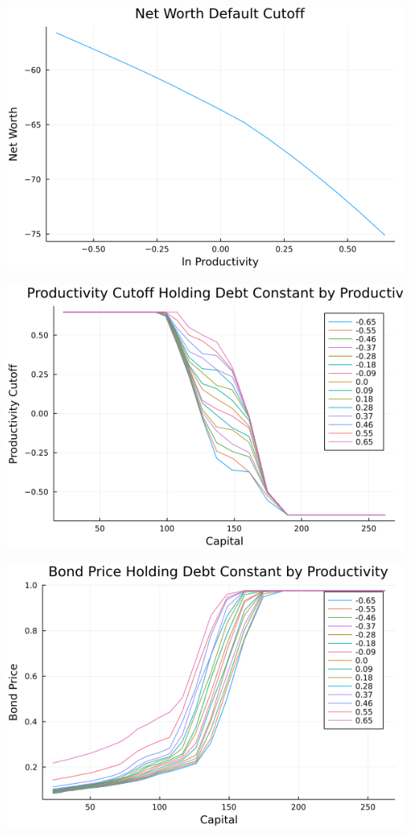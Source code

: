 \documentclass[usenames,dvipsnames, handout]{beamer}
\begin{document}
\begin{frame}
\begin{center}
\includegraphics[scale = 0.5]{w_bar.png}
\end{center}
\end{frame}

\begin{frame}
\begin{center}
\includegraphics[scale = 0.5]{z_d.png}
\end{center}
\end{frame}

\begin{frame}
\begin{center}
\includegraphics[scale = 0.5]{q.png}
\end{center}
\end{frame}
\end{document}
